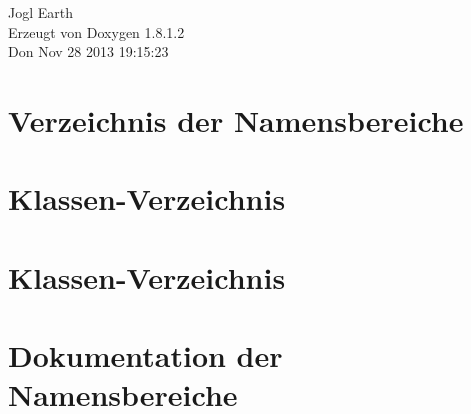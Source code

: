 \documentclass{book}
\begin{document}
\begin{titlepage}
\vspace*{7cm}
\begin{center}
{\Large Jogl Earth }\\
\vspace*{1cm}
{\large Erzeugt von Doxygen 1.8.1.2}\\
\vspace*{0.5cm}
{\small Don Nov 28 2013 19:15:23}\\
\end{center}
\end{titlepage}
\clearemptydoublepage
{}
\tableofcontents
\clearemptydoublepage
{}
\chapter{Verzeichnis der Namensbereiche}

\chapter{Klassen-\/\-Verzeichnis}

\chapter{Klassen-\/\-Verzeichnis}

\chapter{Dokumentation der Namensbereiche}













\end{document}
